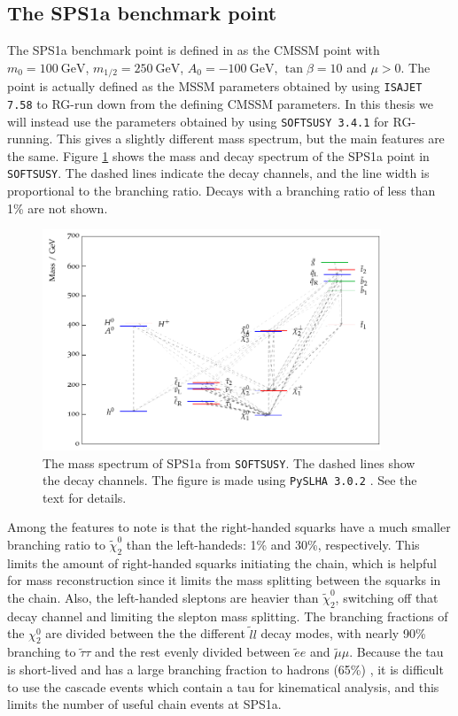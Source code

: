 \documentclass[twoside,english]{uiofysmaster}
\begin{document}
\subsection{The SPS1a benchmark point}
\label{sec:sps1a_benchmark_point}
The SPS1a benchmark point is defined in \cite{Allanach:2002nj} as the CMSSM point with $m_0=100~\mathrm{GeV}$, $m_{1/2}=250~\mathrm{GeV}$, $A_0=-100~\mathrm{GeV}$, $\tan \beta = 10$ and $\mu > 0$. The point is actually defined as the MSSM parameters obtained by using {\tt ISAJET 7.58} \cite{Baer:1999sp} to RG-run down from the defining CMSSM parameters. In this thesis we will instead use the parameters obtained by using {\tt SOFTSUSY 3.4.1} \cite{Allanach:2001kg} for RG-running. This gives a slightly different mass spectrum, but the main features are the same. Figure \ref{fig:SPS1a_softsusy_spectrum} shows the mass and decay spectrum of the SPS1a point in {\tt SOFTSUSY}. The dashed lines indicate the decay channels, and the line width is proportional to the branching ratio. Decays with a branching ratio of less than 1\% are not shown.
\begin{figure}[hbt]
  \includegraphics[width=0.9\textwidth]{figures/susyintro/softsusy_sps1a_with_branchings_original.pdf}
  \caption{The mass spectrum of SPS1a from {\tt SOFTSUSY}. The dashed lines show the decay channels. The figure is made using {\tt PySLHA 3.0.2} \cite{Buckley:2013jua}. See the text for details.}
  \label{fig:SPS1a_softsusy_spectrum}
\end{figure}
Among the features to note is that the right-handed squarks have a much smaller branching ratio to $\tilde \chi_2^0$ than the left-handeds: 1\% and 30\%, respectively. This limits the amount of right-handed squarks initiating the chain, which is helpful for mass reconstruction since it limits the mass splitting between the squarks in the chain. Also, the left-handed sleptons are heavier than $\tilde \chi_2^0$, switching off that decay channel and limiting the slepton mass splitting. The branching fractions of the $\chi_2^0$ are divided between the the different $\tilde l l$ decay modes, with nearly 90\% branching to $\tilde \tau \tau$ and the rest evenly divided between $\tilde e e$ and $\tilde \mu \mu$. Because the tau is short-lived and has a large branching fraction to hadrons (65\%) \cite{Agashe:2014kda}, it is difficult to use the cascade events which contain a tau for kinematical analysis, and this limits the number of useful chain events at SPS1a.
\end{document}
